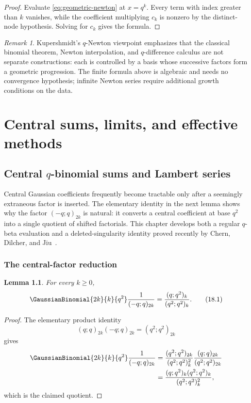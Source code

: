\documentclass[11pt,a4paper,oneside,openany]{book}
\newtheorem{lemma}[lemma]{Lemma}
\theoremstyle{definition}
\theoremstyle{remark}
\newtheorem{remark}[remark]{Remark}
\begin{document}
\begin{proof}
Evaluate \eqref{eq:geometric-newton} at $x=q^k$.  Every term with index greater than $k$ vanishes, while the coefficient multiplying $c_k$ is nonzero by the distinct-node hypothesis.  Solving for $c_k$ gives the formula.
\end{proof}

\begin{remark}
Kupershmidt's $q$-Newton viewpoint emphasizes that the classical binomial theorem, Newton interpolation, and $q$-difference calculus are not separate constructions: each is controlled by a basis whose successive factors form a geometric progression.  The finite formula above is algebraic and needs no convergence hypothesis; infinite Newton series require additional growth conditions on the data.
\end{remark}

\part{Central sums, limits, and effective methods}

\chapter{Central \texorpdfstring{$q$}{q}-binomial sums and Lambert series}\label{chap:central}

Central Gaussian coefficients frequently become tractable only after a seemingly extraneous factor is inserted.  The elementary identity in the next lemma shows why the factor $(-q;q)_{2k}$ is natural: it converts a central coefficient at base $q^2$ into a single quotient of shifted factorials.  This chapter develops both a regular $q$-beta evaluation and a deleted-singularity identity proved recently by Chern, Dilcher, and Jiu~\cite{ChernDilcherJiu2026}.

\section{The central-factor reduction}

\begin{lemma}\label{lem:central-reduction}
For every $k\ge0$,
\[
 \GaussianBinomial{2k}{k}{q^2}\frac1{(-q;q)_{2k}}
 =\frac{(q;q^2)_k}{(q^2;q^2)_k}.
 \tag{18.1}\label{eq:central-reduction}
\]
\end{lemma}

\begin{proof}
The elementary product identity
\[
 (q;q)_{2k}(-q;q)_{2k}=(q^2;q^2)_{2k}
\]
gives
\begin{align*}
 \GaussianBinomial{2k}{k}{q^2}\frac1{(-q;q)_{2k}}
 &=\frac{(q^2;q^2)_{2k}}{(q^2;q^2)_k^2}
   \frac{(q;q)_{2k}}{(q^2;q^2)_{2k}}\\
 &=\frac{(q;q^2)_k(q^2;q^2)_k}{(q^2;q^2)_k^2},
\end{align*}
which is the claimed quotient.
\end{proof}
\end{document}
